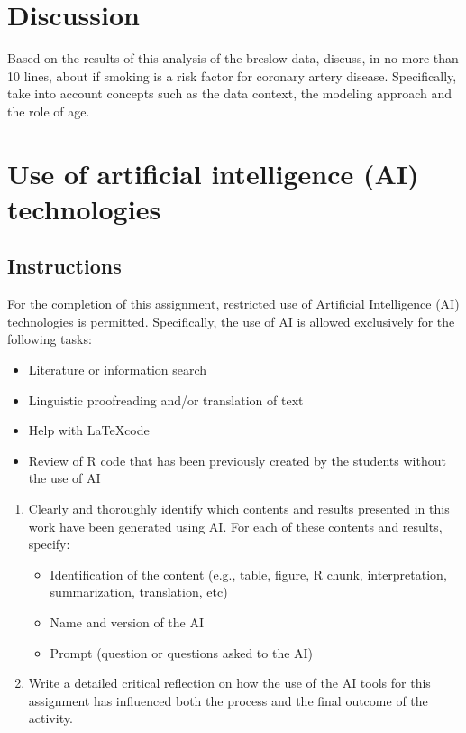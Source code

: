 \documentclass[10pt,a4paper,twoside]{article}\usepackage[]{graphicx}\usepackage[]{xcolor}
\begin{document}

\section{Discussion}
\label{sec:Discussion}

Based on the results of this analysis of the breslow data, discuss, in no more than 10 lines, about if smoking is a risk factor for coronary artery disease. Specifically, take into account concepts such as the data context, the modeling approach and the role of age.

\section{Use of artificial intelligence (AI) technologies}
\label{sec:AIuse}
\subsection{Instructions}
\label{sec:Instructions}
For the completion of this assignment, restricted use of Artificial Intelligence (AI) technologies is permitted. Specifically, the use of AI is allowed exclusively for the following tasks:

\begin{itemize}
    \item Literature or information search
    \item Linguistic proofreading and/or translation of text
    \item Help with \LaTeX code
    \item Review of R code that has been previously created by the students without the use of AI
\end{itemize}
\begin{enumerate}
    \item Clearly and thoroughly identify which contents and results presented in this work have been generated using AI. For each of these contents and results, specify:
    \begin{itemize}
        \item  Identification of the content (e.g., table, figure, R chunk, interpretation, summarization, translation, etc)
        \item Name and version of the AI
        \item Prompt (question or questions asked to the AI)
    \end{itemize}
    \item Write a detailed critical reflection on how the use of the AI tools for this assignment has influenced both the process and the final outcome of the activity.
\end{enumerate}
\end{document}
